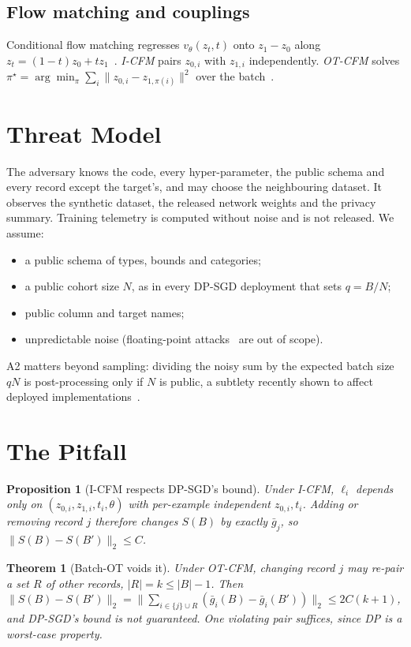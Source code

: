 \documentclass[journal]{IEEEtran}
\newtheorem{proposition}{Proposition}
\newtheorem{theorem}{Theorem}
\begin{document}
\subsection{Flow matching and couplings}
Conditional flow matching regresses $v_\theta(z_t,t)$ onto $z_1-z_0$ along $z_t=(1-t)z_0+tz_1$~\cite{lipman2023flow}. \emph{I-CFM} pairs $z_{0,i}$ with $z_{1,i}$ independently. \emph{OT-CFM} solves $\pi^\star=\arg\min_\pi\sum_i\|z_{0,i}-z_{1,\pi(i)}\|^2$ over the batch~\cite{kuhn1955hungarian,tong2024improving}.

\section{Threat Model}\label{sec:threat}
The adversary knows the code, every hyper-parameter, the public schema and every record except the target's, and may choose the neighbouring dataset. It observes the synthetic dataset, the released network weights and the privacy summary. Training telemetry is computed without noise and is not released. We assume:
\begin{itemize}
\item[A1] a public schema of types, bounds and categories;
\item[A2] a public cohort size $N$, as in every DP-SGD deployment that sets $q=B/N$;
\item[A3] public column and target names;
\item[A4] unpredictable noise (floating-point attacks~\cite{mironov2012lsb} are out of scope).
\end{itemize}
A2 matters beyond sampling: dividing the noisy sum by the expected batch size $qN$ is post-processing only if $N$ is public, a subtlety recently shown to affect deployed implementations~\cite{wang2026rethinking}.

\section{The Pitfall}\label{sec:pitfall}
\begin{proposition}[I-CFM respects DP-SGD's bound]\label{prop:icfm}
Under I-CFM, $\ell_i$ depends only on $(z_{0,i},z_{1,i},t_i,\theta)$ with per-example independent $z_{0,i},t_i$. Adding or removing record $j$ therefore changes $S(B)$ by exactly $\bar g_j$, so $\|S(B)-S(B')\|_2\le C$.
\end{proposition}

\begin{theorem}[Batch-OT voids it]\label{thm:ot}
Under OT-CFM, changing record $j$ may re-pair a set $R$ of other records, $|R|=k\le|B|-1$. Then $\|S(B)-S(B')\|_2=\|\sum_{i\in\{j\}\cup R}(\bar g_i(B)-\bar g_i(B'))\|_2\le2C(k+1)$, and DP-SGD's bound is not guaranteed. One violating pair suffices, since DP is a worst-case property.
\end{theorem}
\end{document}

